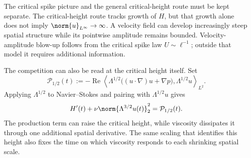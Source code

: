 The critical spike picture and the general critical-height route must be kept separate.
The critical-height route tracks growth of \(H\), but that growth alone does not imply \(\norm{u}_{L^\infty}\to\infty\).
A velocity field can develop increasingly steep spatial structure while its pointwise amplitude remains bounded.
Velocity-amplitude blow-up follows from the critical spike law \(U\sim\ell^{-1}\); outside that model it requires additional information.

The competition can also be read at the critical height itself.
Set
\[
  \mathcal P_{1/2}(t)
  :=-
  \operatorname{Re}
  \left\langle
    \Lambda^{1/2}\bigl((u\cdot\nabla)u+\nabla p\bigr),
    \Lambda^{1/2}u
  \right\rangle_{L^2}.
\]
Applying \(\Lambda^{1/2}\) to Navier--Stokes and pairing with \(\Lambda^{1/2}u\) gives
\begin{equation}\label{eq:BodyCriticalHeightBalance}
  H'(t)
  +\nu\norm{\Lambda^{3/2}u(t)}_2^2
  =\mathcal P_{1/2}(t).
\end{equation}
The production term can raise the critical height, while viscosity dissipates it through one additional spatial derivative.
The same scaling that identifies this height also fixes the time on which viscosity responds to each shrinking spatial scale.

